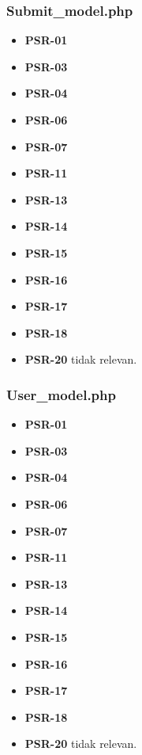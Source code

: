 \subsubsection{Submit\_model.php}
\begin{itemize}
	\item \textbf{PSR-01} 
	\item \textbf{PSR-03}
	\item \textbf{PSR-04}
	\item \textbf{PSR-06}
	\item \textbf{PSR-07}
	\item \textbf{PSR-11}
	\item \textbf{PSR-13}
	\item \textbf{PSR-14}
	\item \textbf{PSR-15}
	\item \textbf{PSR-16}
	\item \textbf{PSR-17} 
	\item \textbf{PSR-18} 
	\item \textbf{PSR-20} tidak relevan.
\end{itemize}

\subsubsection{User\_model.php}
\begin{itemize}
	\item \textbf{PSR-01} 
	\item \textbf{PSR-03}
	\item \textbf{PSR-04}
	\item \textbf{PSR-06}
	\item \textbf{PSR-07}
	\item \textbf{PSR-11}
	\item \textbf{PSR-13}
	\item \textbf{PSR-14}
	\item \textbf{PSR-15}
	\item \textbf{PSR-16}
	\item \textbf{PSR-17} 
	\item \textbf{PSR-18} 
	\item \textbf{PSR-20} tidak relevan.
\end{itemize}

